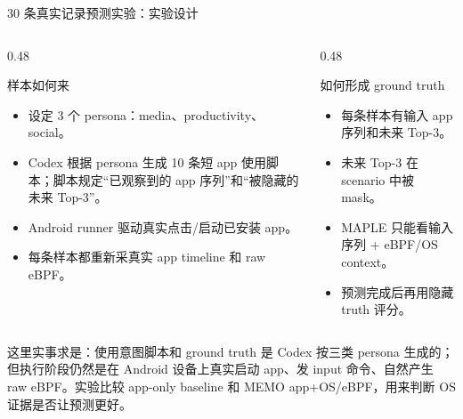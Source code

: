 \documentclass[UTF8,aspectratio=169,10pt]{ctexbeamer}
\newcommand{\explainfoot}[1]{%
  \vspace{0.35em}
  {\scriptsize\color{memoGray}#1}
}
\begin{document}
\begin{frame}{30 条真实记录预测实验：实验设计}
  \small
  \begin{columns}[T,totalwidth=\textwidth]
    \begin{column}{0.48\textwidth}
      \begin{block}{样本如何来}
        \begin{itemize}
          \item 设定 3 个 persona：media、productivity、social。
          \item Codex 根据 persona 生成 10 条短 app 使用脚本；脚本规定“已观察到的 app 序列”和“被隐藏的未来 Top-3”。
          \item Android runner 驱动真实点击/启动已安装 app。
          \item 每条样本都重新采真实 app timeline 和 raw eBPF。
        \end{itemize}
      \end{block}
    \end{column}
    \begin{column}{0.48\textwidth}
      \begin{block}{如何形成 ground truth}
        \begin{itemize}
          \item 每条样本有输入 app 序列和未来 Top-3。
          \item 未来 Top-3 在 scenario 中被 mask。
          \item MAPLE 只能看输入序列 + eBPF/OS context。
          \item 预测完成后再用隐藏 truth 评分。
        \end{itemize}
      \end{block}
    \end{column}
  \end{columns}
  \explainfoot{这里实事求是：使用意图脚本和 ground truth 是 Codex 按三类 persona 生成的；但执行阶段仍然是在 Android 设备上真实启动 app、发 input 命令、自然产生 raw eBPF。实验比较 app-only baseline 和 MEMO app+OS/eBPF，用来判断 OS 证据是否让预测更好。}
\end{frame}
\end{document}
